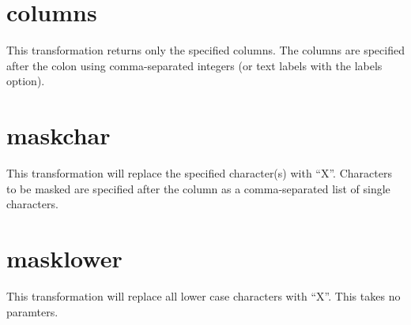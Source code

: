 \documentclass[letterpaper,11pt,english]{sphinxmanual}
\begin{document}
\section{columns}
\label{\detokenize{mvf_filter_modules:columns}}
This transformation returns only the specified columns.
The columns are specified after the colon using comma-separated integers
(or text labels with the \textendash{}labels option).

\begin{sphinxVerbatim}[commandchars=\\\{\}]
  
 
 
\end{sphinxVerbatim}


\section{maskchar}
\label{\detokenize{mvf_filter_modules:maskchar}}
This transformation will replace the specified character(s) with “X”.
Characters to be masked are specified after the column
as a comma-separated list of single characters.

\begin{sphinxVerbatim}[commandchars=\\\{\}]
  
 
 
\end{sphinxVerbatim}


\section{masklower}
\label{\detokenize{mvf_filter_modules:masklower}}
This transformation will replace all lower case characters with “X”.
This takes no paramters.

\begin{sphinxVerbatim}[commandchars=\\\{\}]
  
 
 
\end{sphinxVerbatim}
\end{document}
